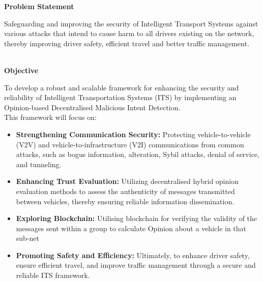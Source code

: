 \documentclass[a4paper,14pt]{extarticle}
\begin{document}
\newpage
\begin{center}
    {\LARGE \textbf{Problem Statement}} \\
    \vspace{1cm}
\end{center}
Safeguarding and improving the security of Intelligent Transport Systems against various attacks that intend to cause harm to all drivers existing on the network, thereby improving driver safety, efficient travel and better traffic management.
\\ \\
\begin{center}
    {\LARGE \textbf{Objective}} \\
    \vspace{1cm}
\end{center}
To develop a robust and scalable framework for enhancing the security and reliability of Intelligent Transportation Systems (ITS) by implementing an Opinion-based Decentralised Malicious Intent Detection. 
\\
This framework will focus on:
\begin{itemize}
    \item \textbf{Strengthening Communication Security:} Protecting vehicle-to-vehicle (V2V) and vehicle-to-infrastructure (V2I) communications from common attacks, such as bogus information, alteration, Sybil attacks, denial of service, and tunneling.
    
    \item \textbf{Enhancing Trust Evaluation:} Utilizing decentralised hybrid opinion evaluation methods to assess the authenticity of messages transmitted between vehicles, thereby ensuring reliable information dissemination.

    \item \textbf{Exploring Blockchain:} Utilising blockchain for verifying the validity of the messages sent within a group to calculate Opinion about a vehicle in that sub-net

    \item \textbf{Promoting Safety and Efficiency:} Ultimately, to enhance driver safety, ensure efficient travel, and improve traffic management through a secure and reliable ITS framework.
\end{itemize}
\end{document}
